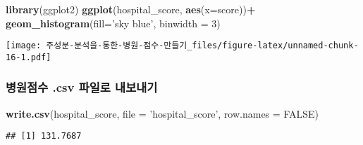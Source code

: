 \documentclass[
]{article}
\newenvironment{Shaded}{\begin{snugshade}}{\end{snugshade}}
\newcommand{\CommentTok}[1]{\textcolor[rgb]{0.56,0.35,0.01}{\textit{#1}}}
\newcommand{\DataTypeTok}[1]{\textcolor[rgb]{0.13,0.29,0.53}{#1}}
\newcommand{\DecValTok}[1]{\textcolor[rgb]{0.00,0.00,0.81}{#1}}
\newcommand{\FloatTok}[1]{\textcolor[rgb]{0.00,0.00,0.81}{#1}}
\newcommand{\KeywordTok}[1]{\textcolor[rgb]{0.13,0.29,0.53}{\textbf{#1}}}
\newcommand{\NormalTok}[1]{#1}
\newcommand{\OperatorTok}[1]{\textcolor[rgb]{0.81,0.36,0.00}{\textbf{#1}}}
\newcommand{\OtherTok}[1]{\textcolor[rgb]{0.56,0.35,0.01}{#1}}
\newcommand{\StringTok}[1]{\textcolor[rgb]{0.31,0.60,0.02}{#1}}
\begin{document}
\begin{Shaded}
\begin{Highlighting}[]
\KeywordTok{library}\NormalTok{(ggplot2)}
\KeywordTok{ggplot}\NormalTok{(hospital_score, }\KeywordTok{aes}\NormalTok{(}\DataTypeTok{x=}\NormalTok{score))}\OperatorTok{+}
\StringTok{  }\KeywordTok{geom_histogram}\NormalTok{(}\DataTypeTok{fill=}\StringTok{'sky blue'}\NormalTok{, }\DataTypeTok{binwidth =} \DecValTok{3}\NormalTok{)}
\end{Highlighting}
\end{Shaded}

\texttt{[image: 주성분-분석을-통한-병원-점수-만들기\_files/figure-latex/unnamed-chunk-16-1.pdf]}

\hypertarget{uxbcd1uxc6d0uxc810uxc218-.csv-uxd30cuxc77cuxb85c-uxb0b4uxbcf4uxb0b4uxae30}{%
\subsubsection{병원점수 .csv 파일로
내보내기}\label{uxbcd1uxc6d0uxc810uxc218-.csv-uxd30cuxc77cuxb85c-uxb0b4uxbcf4uxb0b4uxae30}}

\begin{Shaded}
\begin{Highlighting}[]
\KeywordTok{write.csv}\NormalTok{(hospital_score, }\DataTypeTok{file =} \StringTok{'hospital_score'}\NormalTok{, }\DataTypeTok{row.names =} \OtherTok{FALSE}\NormalTok{)}
\end{Highlighting}
\end{Shaded}

\begin{Shaded}
\end{Shaded}

\begin{verbatim}
## [1] 131.7687
\end{verbatim}

\begin{Shaded}
\end{Shaded}
\end{document}
